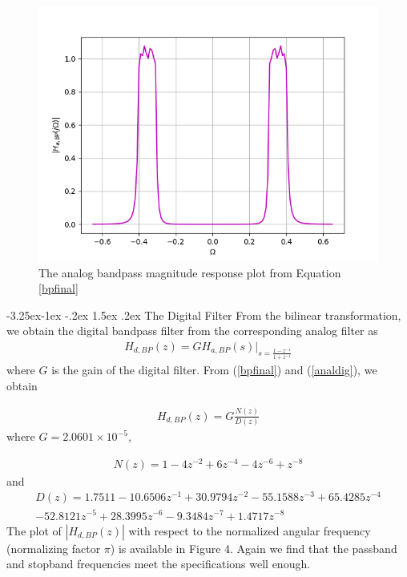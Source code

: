 \documentclass[article]{IEEEtran}
\makeatletter
\theoremstyle{remark}
\numberwithin{equation}{subsection}
\renewcommand\subsection{\@startsection{subsection}{2}{\z@}%
    {-3.25ex\@plus -1ex \@minus -.2ex}%
    {1.5ex \@plus .2ex}%
    {\normalfont\large\bfseries}}
\makeatother
\begin{document}
\begin{figure}[H]
\label{fig3}
\includegraphics[width = \columnwidth]{figs/fig3.png}
\caption{The analog bandpass magnitude response plot from Equation \ref{bpfinal}} 
\end{figure}

\subsection{The Digital Filter}
From the bilinear transformation, we obtain the digital bandpass filter from the corresponding analog filter as
\begin{eqnarray}
\label{analdig}
H_{d,BP}(z) = GH_{a,BP}(s)\vert_{s = \frac{1-z^{-1}}{1 + z^{-1}}}
\end{eqnarray}
where $G$ is the gain of the digital filter.  From (\ref{bpfinal}) and (\ref{analdig}), we obtain

\begin{eqnarray}
H_{d,BP}(z) = G \frac{N(z)}{D(z)}
\end{eqnarray}
where $G =  2.0601\times 10^{-5}$,

\begin{eqnarray}
N(z)=  1 - 4 z^{-2} + 6 z^{-4} - 4z^{-6} + z^{-8} 
\end{eqnarray}
and
{\small
\begin{eqnarray}
D(z) = 1.7511  -10.6506z^{-1} + 30.9794z^{-2}  -55.1588z^{-3}+  65.4285z^{-4}\nonumber \\
  -52.8121z^{-5}+   28.3995z^{-6}  -9.3484z^{-7} +   1.4717z^{-8}
\end{eqnarray}
}
The plot of $|H_{d,BP}(z)|$ with respect to the normalized angular frequency (normalizing factor $\pi$) is available in Figure 4.  Again we
find that the passband and stopband frequencies meet the specifications well enough.
\end{document}
